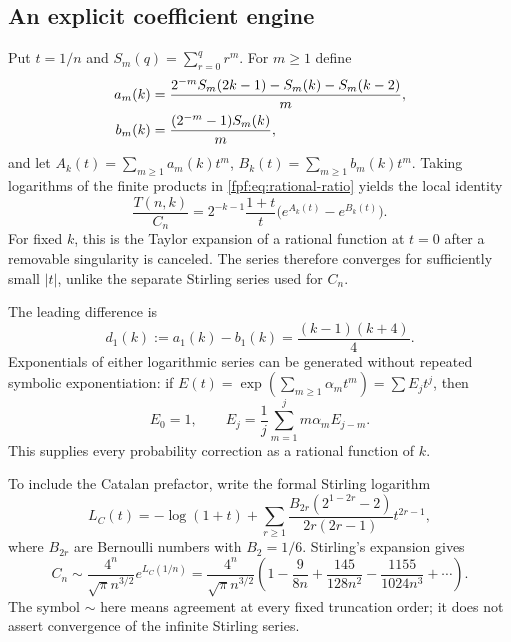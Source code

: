 \documentclass[11pt]{article}
\numberwithin{equation}{section}
\theoremstyle{definition}
\begin{document}
\subsection{An explicit coefficient engine}
Put $t=1/n$ and $S_m(q)=\sum_{r=0}^q r^m$. For $m\ge1$ define
\begin{align}\label{fpf:eq:ab}
 a_m(k)&=\frac{2^{-m}S_m(2k-1)-S_m(k)-S_m(k-2)}{m},\notag\\
 b_m(k)&=\frac{(2^{-m}-1)S_m(k)}{m},
\end{align}
and let $A_k(t)=\sum_{m\ge1}a_m(k)t^m$,
$B_k(t)=\sum_{m\ge1}b_m(k)t^m$.
Taking logarithms of the finite products in
\eqref{fpf:eq:rational-ratio} yields the local identity
\begin{equation}\label{fpf:eq:probability-engine}
 \frac{T(n,k)}{C_n}
 =2^{-k-1}\frac{1+t}{t}
       \bigl(e^{A_k(t)}-e^{B_k(t)}\bigr).
\end{equation}
For fixed $k$, this is the Taylor expansion of a rational function at
$t=0$ after a removable singularity is canceled. The series therefore
converges for sufficiently small $|t|$, unlike the separate Stirling series
used for $C_n$.

The leading difference is
\begin{equation}\label{fpf:eq:d1}
 d_1(k):=a_1(k)-b_1(k)=\frac{(k-1)(k+4)}4.
\end{equation}
Exponentials of either logarithmic series can be generated without repeated
symbolic exponentiation: if $E(t)=\exp(\sum_{m\ge1}\alpha_mt^m)=\sum E_jt^j$,
then
\begin{equation}\label{fpf:eq:exp-rec}
 E_0=1,\qquad E_j=\frac1j\sum_{m=1}^j m\alpha_m E_{j-m}.
\end{equation}
This supplies every probability correction as a rational function of $k$.

To include the Catalan prefactor, write the formal Stirling logarithm
\begin{equation}\label{fpf:eq:cat-log}
 L_C(t)=-\log(1+t)+
 \sum_{r\ge1}\frac{B_{2r}(2^{1-2r}-2)}{2r(2r-1)}t^{2r-1},
\end{equation}
where $B_{2r}$ are Bernoulli numbers with $B_2=1/6$. Stirling's expansion
\cite{dlmfgamma} gives
\begin{equation}\label{fpf:eq:cat-exp}
 C_n\sim\frac{4^n}{\sqrt\pi n^{3/2}}e^{L_C(1/n)}
 =\frac{4^n}{\sqrt\pi n^{3/2}}
 \left(1-\frac9{8n}+\frac{145}{128n^2}
                   -\frac{1155}{1024n^3}+\cdots\right).
\end{equation}
The symbol $\sim$ here means agreement at every fixed truncation order; it
does not assert convergence of the infinite Stirling series.
\end{document}
